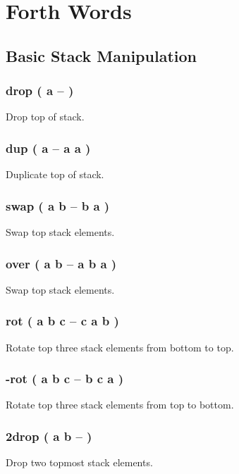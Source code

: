\chapter{Forth Words}

\section{Basic Stack Manipulation}

\subsection{drop ( a -- )}

Drop top of stack.

\subsection{dup ( a -- a a )}

Duplicate top of stack.

\subsection{swap ( a b -- b a )}

Swap top stack elements.

\subsection{over ( a b -- a b a )}

Swap top stack elements.

\subsection{rot ( a b c -- c a b )}

Rotate top three stack elements from bottom to top.

\subsection{-rot ( a b c -- b c a )}

Rotate top three stack elements from top to bottom.

\subsection{2drop ( a b -- )}

Drop two topmost stack elements.

